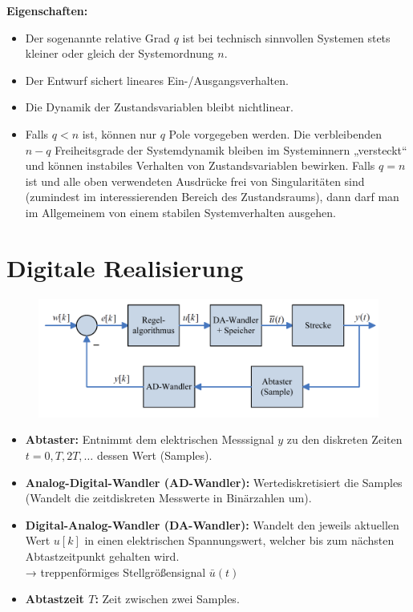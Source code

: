 \documentclass[10pt,a4paper]{article}
\begin{document}
\textbf{Eigenschaften:}
\begin{itemize}
	\item Der sogenannte relative Grad $q$ ist bei technisch sinnvollen Systemen stets kleiner oder gleich der Systemordnung $n$.
	\item Der Entwurf sichert lineares Ein-/Ausgangsverhalten.
	\item Die Dynamik der Zustandsvariablen bleibt nichtlinear.
	\item Falls $q < n$ ist, können nur $q$ Pole vorgegeben werden. Die verbleibenden $n − q$ Freiheitsgrade der Systemdynamik bleiben im Systeminnern „versteckt“ und können instabiles Verhalten von Zustandsvariablen bewirken. Falls $q = n$ ist und alle oben verwendeten Ausdrücke frei von Singularitäten sind (zumindest im interessierenden Bereich des Zustandsraums), dann darf man im Allgemeinem von einem stabilen Systemverhalten ausgehen.
\end{itemize}

\section{Digitale Realisierung}
\begin{figure}[H]
	\includegraphics[width=\columnwidth]{imgs/abb8_1.png}
\end{figure}

\begin{itemize}
	\item \textbf{Abtaster:} Entnimmt dem elektrischen Messsignal $y$ zu den diskreten Zeiten $t = 0, T, 2T, \dots$ dessen Wert (Samples).
	\item \textbf{Analog-Digital-Wandler (AD-Wandler):} Wertediskretisiert die Samples (Wandelt die zeitdiskreten Messwerte in Binärzahlen um).
	\item \textbf{Digital-Analog-Wandler (DA-Wandler):} Wandelt den jeweils aktuellen Wert $u[k]$ in einen elektrischen Spannungswert, welcher bis zum nächsten Abtastzeitpunkt gehalten wird. \\
	→ treppenförmiges Stellgrößensignal $\bar u(t)$
	\item \textbf{Abtastzeit $T$:} Zeit zwischen zwei Samples.
\end{itemize}
\end{document}
